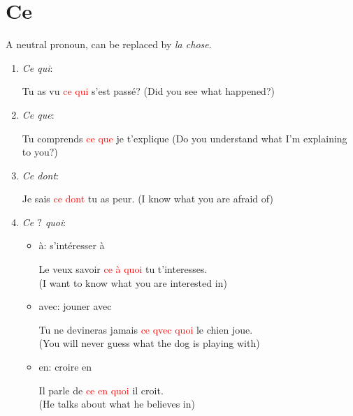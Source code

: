 \documentclass{book}
\begin{document}
    \section{Ce}
        A neutral pronoun, can be replaced by \textit{la chose}.
        \begin{enumerate}
            \item \textit{Ce qui}: 
                \begin{center}
                    Tu as vu \textcolor{red}{ce qui} s'est passé? (Did you see what happened?)
                \end{center}
            
            \item \textit{Ce que}:
                \begin{center}
                    Tu comprends \textcolor{red}{ce que} je t'explique (Do you understand what I'm explaining to you?)
                \end{center}
            
            \item \textit{Ce dont}:
                \begin{center}
                    Je sais \textcolor{red}{ce dont} tu as peur. (I know what you are afraid of)
                \end{center}

            \item \textit{Ce $?$ quoi}:
                \begin{itemize}
                    \item à: s'intéresser à
                        \begin{center}
                            Le veux savoir \textcolor{red}{ce à quoi} tu t'interesses. \\
                            (I want to know what you are interested in)
                        \end{center}

                    \item avec: jouner avec
                        \begin{center}
                            Tu ne devineras jamais \textcolor{red}{ce qvec quoi} le chien joue. \\
                            (You will never guess what the dog is playing with)
                        \end{center}

                    \item en: croire en
                        \begin{center}
                            Il parle de \textcolor{red}{ce en quoi} il croit. \\
                            (He talks about what he believes in)
                        \end{center}
                    

\end{itemize}
\end{enumerate}
\end{document}
